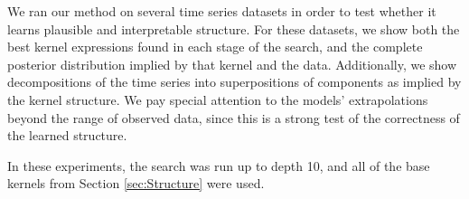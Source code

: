 \documentclass[twoside]{article}
\begin{document}

We ran our method on several time series datasets in order to test whether it learns plausible and interpretable structure. 
For these datasets, we show both the best kernel expressions found in each stage of the search, and the complete posterior distribution implied by that kernel and the data. 
Additionally, we show decompositions of the time series into superpositions of components as implied by the kernel structure.
We pay special attention to the models' extrapolations beyond the range of observed data, since this is a strong test of the correctness of the learned structure.

In these experiments, the search was run up to depth 10, and all of the base kernels from Section \ref{sec:Structure} were used.



\end{document}

